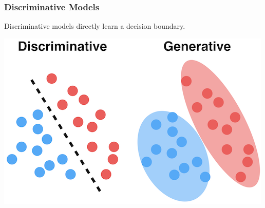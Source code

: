 \documentclass[aspectratio = 169]{beamer}
\DeclareMathOperator*{\argmax}{arg \, max}
\begin{document}

\begin{frame}

\frametitle{Discriminative Models}

Discriminative models directly learn a decision boundary.


\vspace{0.4cm}

\begin{centering}

\includegraphics[scale = 0.4]{Figures/discriminative.png}

\end{centering}







\end{frame}
\end{document}
